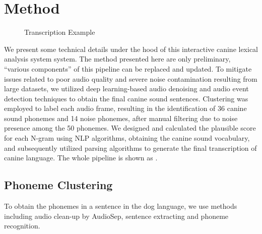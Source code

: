 \section{Method}

\begin{figure}[th]
    \centering
    \caption{Transcription Example}
    \label{fig:sys1}
\end{figure}

We present some technical details under the hood of this interactive canine lexical analysis system system. The method presented here are only preliminary, ``various components'' of this pipeline can be replaced and updated. To mitigate issues related to poor audio quality and severe noise contamination resulting from large datasets, we utilized deep learning-based audio denoising and audio event detection techniques to obtain the final canine sound sentences. Clustering was employed to label each audio frame, resulting in the identification of 36 canine sound phonemes and 14 noise phonemes, after manual filtering due to noise presence among the 50 phonemes. We designed and calculated the plausible score for each N-gram using NLP algorithms, obtaining the canine sound vocabulary, and subsequently utilized parsing algorithms to generate the final transcription of canine language. The whole pipeline is shown as .

\subsection{Phoneme Clustering}

To obtain the phonemes in a sentence in the dog language, we use methods including audio clean-up by AudioSep, sentence extracting and phoneme recognition.

